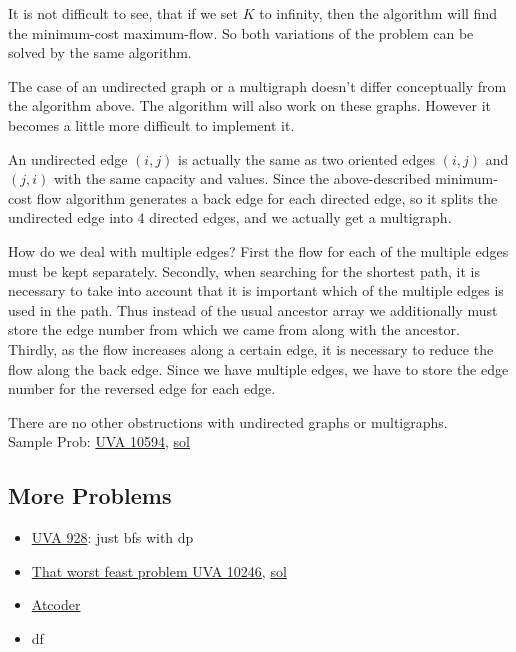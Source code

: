 \documentclass[8pt, a4paper, oneside, twocolumn]{extarticle}
\begin{document}
It is not difficult to see, that if we set $K$ to infinity, then the algorithm will find the minimum-cost maximum-flow. So both variations of the problem can be solved by the same algorithm.

The case of an undirected graph or a multigraph doesn't differ conceptually from the algorithm above. The algorithm will also work on these graphs. However it becomes a little more difficult to implement it.

An undirected edge $(i, j)$ is actually the same as two oriented edges $(i, j)$ and $(j, i)$ with the same capacity and values. Since the above-described minimum-cost flow algorithm generates a back edge for each directed edge, so it splits the undirected edge into $4$ directed edges, and we actually get a multigraph.

How do we deal with multiple edges? First the flow for each of the multiple edges must be kept separately. Secondly, when searching for the shortest path, it is necessary to take into account that it is important which of the multiple edges is used in the path. Thus instead of the usual ancestor array we additionally must store the edge number from which we came from along with the ancestor. Thirdly, as the flow increases along a certain edge, it is necessary to reduce the flow along the back edge. Since we have multiple edges, we have to store the edge number for the reversed edge for each edge.

There are no other obstructions with undirected graphs or multigraphs.
\\Sample Prob: \href{https://uva.onlinejudge.org/external/105/10594.pdf}{UVA 10594}, \href{https://github.com/sourabh2311/Competitive-Programming/blob/master/UVA_10594_Better.cpp}{sol}
\subsection{More Problems}
\begin{itemize}
    \item \href{}{UVA 928}: just bfs with dp
    \item \href{https://uva.onlinejudge.org/external/102/10246.pdf}{That worst feast problem UVA 10246}, \href{https://gist.github.com/sourabh2311/e55a0e3f7453e4514f1251b1ae6f0827}{sol}
    \item \href{https://gist.github.com/sourabh2311/a9f9b7584631b8859692df0f4af0843d}{Atcoder}
    \item df
\end{itemize}
\end{document}
